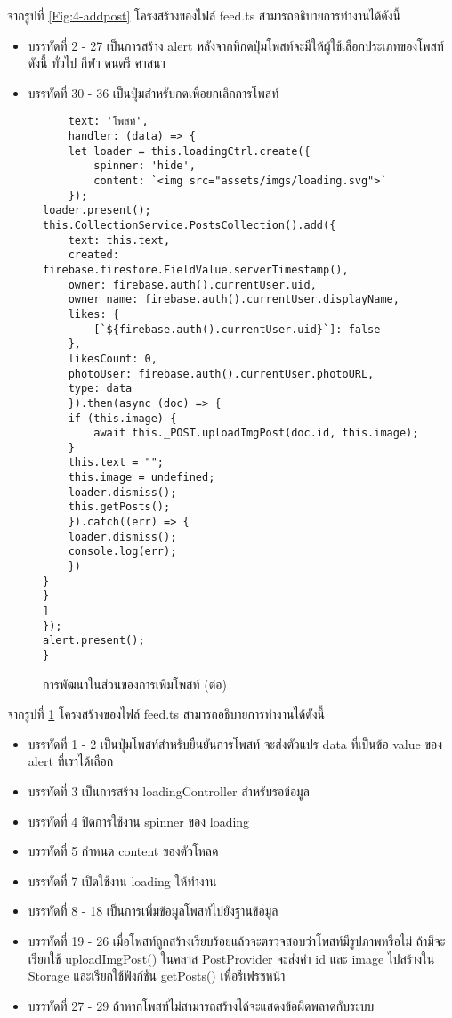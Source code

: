 จากรูปที่ \ref{Fig:4-addpost} โครงสร้างของไฟล์ feed.ts สามารถอธิบายการทำงานได้ดังนี้
\begin{itemize}[label={--}]
\item บรรทัดที่ 2 - 27 เป็นการสร้าง alert หลังจากที่กดปุ่มโพสท์จะมีให้ผู้ใช้เลือกประเภทของโพสท์ดังนี้ ทั่วไป กีฬา ดนตรี ศาสนา
\item บรรทัดที่ 30 - 36 เป็นปุ่มสำหรับกดเพื่อยกเลิกการโพสท์
\end{itemize}
\newpage



\begin{figure}[H]
	{\lstset{language=Pascal}
	\begin{lstlisting}
	text: 'โพสท์',
	handler: (data) => {        
	let loader = this.loadingCtrl.create({
		spinner: 'hide',
		content: `<img src="assets/imgs/loading.svg">`
	});
loader.present();
this.CollectionService.PostsCollection().add({
	text: this.text,
	created: firebase.firestore.FieldValue.serverTimestamp(),
	owner: firebase.auth().currentUser.uid,
	owner_name: firebase.auth().currentUser.displayName,
	likes: {
		[`${firebase.auth().currentUser.uid}`]: false
	},
	likesCount: 0,
	photoUser: firebase.auth().currentUser.photoURL,
	type: data
	}).then(async (doc) => {
	if (this.image) {
		await this._POST.uploadImgPost(doc.id, this.image);
	}
	this.text = "";
	this.image = undefined;
	loader.dismiss();
	this.getPosts();
	}).catch((err) => {
	loader.dismiss();
	console.log(err);
	})
}
}
]
});
alert.present();
}
	\end{lstlisting}}
	\caption{การพัฒนาในส่วนของการเพิ่มโพสท์ (ต่อ)}
	\label{Fig:4-addpostcon1}
	\end{figure}
	\newpage
	
	จากรูปที่ \ref{Fig:4-addpostcon1} โครงสร้างของไฟล์ feed.ts สามารถอธิบายการทำงานได้ดังนี้
	\begin{itemize}[label={--}]
	\item บรรทัดที่ 1 - 2 เป็นปุ่มโพสท์สำหรับยืนยันการโพสท์ จะส่งตัวแปร data ที่เป็นข้อ value ของ alert ที่เราได้เลือก
	\item บรรทัดที่ 3 เป็นการสร้าง loadingController สำหรับรอข้อมูล
	\item บรรทัดที่ 4 ปิดการใช้งาน spinner ของ loading
	\item บรรทัดที่ 5 กำหนด content ของตัวโหลด
	\item บรรทัดที่ 7 เปิดใช้งาน loading ให้ทำงาน
	\item บรรทัดที่ 8 - 18 เป็นการเพิ่มข้อมูลโพสท์ไปยังฐานข้อมูล
	\item บรรทัดที่ 19 - 26 เมื่อโพสท์ถูกสร้างเรียบร้อยแล้วจะตรวจสอบว่าโพสท์มีรูปภาพหรือไม่ ถ้ามีจะเรียกใช้ uploadImgPost() ในคลาส PostProvider จะส่งค่า id และ image ไปสร้างใน Storage และเรียกใช้ฟังก์ชัน getPosts() เพื่อรีเฟรชหน้า
	\item บรรทัดที่ 27 - 29 ถ้าหากโพสท์ไม่สามารถสร้างได้จะแสดงข้อผิดพลาดกับระบบ
	\end{itemize}
	\newpage

